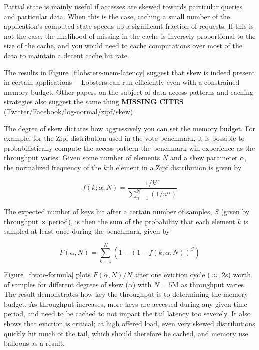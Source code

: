 Partial state is mainly useful if accesses are skewed towards particular queries
and particular data. When this is the case, caching a small number of the
application's computed state speeds up a significant fraction of requests. If
this is not the case, the likelihood of missing in the cache is inversely
proportional to the size of the cache, and you would need to cache computations
over most of the data to maintain a decent cache hit rate.

The results in Figure~\ref{f:lobsters-mem-latency} suggest that skew is indeed
present in certain applications\,---\,Lobsters can run efficiently even with a
constrained memory budget. Other papers on the subject of data access patterns
and caching strategies also suggest the same thing \textbf{MISSING CITES}
(Twitter/Facebook/log-normal/zipf/skew).

The degree of skew dictates how aggressively you can set the memory budget.
For example, for the Zipf distribution used in the vote benchmark, it is
possible to probabilistically compute the access pattern the benchmark will
experience as the throughput varies. Given some number of elements $N$ and a
skew parameter $\alpha$, the normalized frequency of the $k$th element in a Zipf
distribution is given by

\begin{displaymath}
  f(k;\alpha,N)={\frac {1/k^{\alpha}}{\sum \limits _{n=1}^{N}(1/n^{\alpha})}}
\end{displaymath}

The expected number of keys hit after a certain number of samples, $S$ (given by
throughput $\times$ period), is then the sum of the probability that each
element $k$ is sampled at least once during the benchmark, given by

\begin{displaymath}
  F(\alpha,N)={\sum \limits _{k=1}^{N} \left(1 - \left(1 - f(k; \alpha, N)\right)^{S}\right)}
\end{displaymath}

Figure~\ref{f:vote-formula} plots $F(\alpha, N)/N$ after one eviction cycle
($\approx$ 2s) worth of samples for different degrees of skew ($\alpha$) with
$N=5\text{M}$ as throughput varies. The result demonstrates how key the
throughput is to determining the memory budget. As throughput increases, more
keys are accessed during any given time period, and need to be cached to not
impact the tail latency too severely. It also shows that eviction is critical;
at high offered load, even very skewed distributions quickly hit much of the
tail, which should therefore be cached, and memory use balloons as a result.

